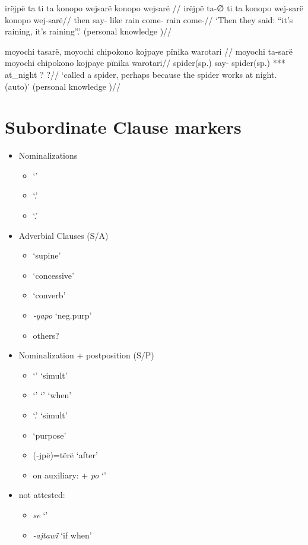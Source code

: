 \documentclass{memoir}
\begin{document}
\ex \label{ctorat-25}
\begingl \glpreamble irëjpë ta ti ta konopo wejsarë konopo wejsarë //
\gla irëjpë ta-∅ ti ta konopo wej-sarë konopo wej-sarë//
\glb then say-  like rain come- rain come-//
\glft ‘Then they said: “it’s raining, it’s raining”.’ (personal knowledge
)//
\endgl
\xe

\ex \label{ctoaragrme-25}
\begingl \glpreamble moyochi tasarë, moyochi chipokono kojpaye pïnika warotari //
\gla moyochi ta-sarë moyochi chipokono kojpaye pïnika warotari//
\glb spider(sp.) say- spider(sp.) *** at\_night ? ?//
\glft ‘called a spider, perhaps because the spider works at night. (auto)’ (personal knowledge
)//
\endgl
\xe

\section{Subordinate Clause markers}

\begin{itemize}
\tightlist
\item
  Nominalizations

  \begin{itemize}
  \tightlist
  \item
     `'
  \item
     `.'
  \item
     `.'
  \end{itemize}
\item
  Adverbial Clauses (S/A)

  \begin{itemize}
  \tightlist
  \item
     `supine'
  \item
     `concessive'
  \item
     `converb'
  \item
    \emph{‑yapo} `neg.purp'
  \item
    others?
  \end{itemize}
\item
  Nominalization + postposition (S/P)

  \begin{itemize}
  \tightlist
  \item
     `' `simult'
  \item
     `'  `' `when'
  \item
     `.' `simult'
  \item
     `purpose'
  \item
    (‑jpë)=tërë `after'
  \item
    on auxiliary:  + \emph{po} `'
  \end{itemize}
\item
  not attested:

  \begin{itemize}
  \tightlist
  \item
    \emph{se} `'
  \item
    \emph{-ajtawï} `if when'
  \end{itemize}
\end{itemize}
\end{document}
